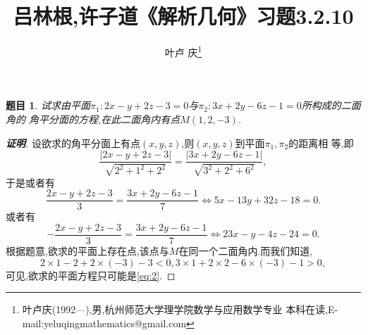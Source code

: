 \documentclass[a4paper]{article}
\newtheorem*{exe}{题目}
\newenvironment{exercise}
{\bigskip\begin{mdframed}\begin{exe}}
    {\end{exe}\end{mdframed}\bigskip}
\begin{document}
\title{\huge{\bf{吕林根,许子道《解析几何》习题3.2.10}}} \author{\small{叶卢
    庆\footnote{叶卢庆(1992---),男,杭州师范大学理学院数学与应用数学专业
      本科在读,E-mail:yeluqingmathematics@gmail.com}}}
\maketitle
\begin{exercise}
  试求由平面$\pi_1:2x-y+2z-3=0$与$\pi_2:3x+2y-6z-1=0$所构成的二面角的
  角平分面的方程,在此二面角内有点$M(1,2,-3)$.
\end{exercise}
\begin{proof}[\textbf{证明}]
设欲求的角平分面上有点$(x,y,z)$,则$(x,y,z)$到平面$\pi_1,\pi_2$的距离相
等,即
$$
\frac{|2x-y+2z-3|}{\sqrt{2^2+1^2+2^2}}=\frac{|3x+2y-6z-1|}{\sqrt{3^2+2^2+6^2}},
$$
于是或者有
\begin{equation}
  \label{eq:1}
  \frac{2x-y+2z-3}{3}=\frac{3x+2y-6z-1}{7}\iff 5x-13y+32z-18=0.
\end{equation}
或者有
\begin{equation}
  \label{eq:2}
-  \frac{2x-y+2z-3}{3}=\frac{3x+2y-6z-1}{7}\iff 23x-y-4z-24=0.
\end{equation}
根据题意,欲求的平面上存在点,该点与$M$在同一个二面角内.而我们知道,
$$
2\times 1-2+2\times(-3)-3<0,3\times 1+2\times 2-6\times(-3)-1>0,
$$
可见,欲求的平面方程只可能是\eqref{eq:2}.
\end{proof}
\end{document}
